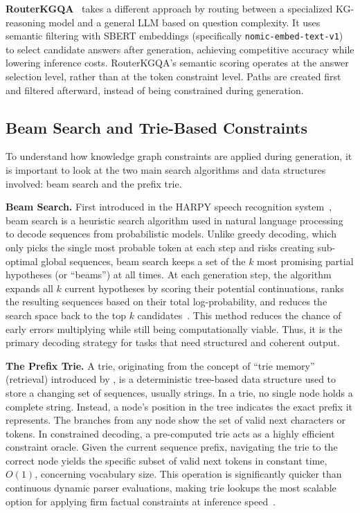 \textbf{RouterKGQA}~\citep{yuan2026routerkgqa} takes a different approach by routing between a specialized KG-reasoning model and a general LLM based on question complexity. It uses semantic filtering with SBERT embeddings (specifically \texttt{nomic-embed-text-v1}) to select candidate answers after generation, achieving competitive accuracy while lowering inference costs. RouterKGQA's semantic scoring operates at the answer selection level, rather than at the token constraint level. Paths are created first and filtered afterward, instead of being constrained during generation.

\subsection{Beam Search and Trie-Based Constraints}

To understand how knowledge graph constraints are applied during generation, it is important to look at the two main search algorithms and data structures involved: beam search and the prefix trie.

\textbf{Beam Search.} First introduced in the HARPY speech recognition system~\citep{lowerre1976harpy}, beam search is a heuristic search algorithm used in natural language processing to decode sequences from probabilistic models. Unlike greedy decoding, which only picks the single most probable token at each step and risks creating sub-optimal global sequences, beam search keeps a set of the $k$ most promising partial hypotheses (or ``beams'') at all times. At each generation step, the algorithm expands all $k$ current hypotheses by scoring their potential continuations, ranks the resulting sequences based on their total log-probability, and reduces the search space back to the top $k$ candidates~\citep{holtzman2020curious}. This method reduces the chance of early errors multiplying while still being computationally viable. Thus, it is the primary decoding strategy for tasks that need structured and coherent output.

\textbf{The Prefix Trie.} A trie, originating from the concept of ``trie memory'' (retrieval) introduced by \citet{fredkin1960trie}, is a deterministic tree-based data structure used to store a changing set of sequences, usually strings. In a trie, no single node holds a complete string. Instead, a node's position in the tree indicates the exact prefix it represents. The branches from any node show the set of valid next characters or tokens. In constrained decoding, a pre-computed trie acts as a highly efficient constraint oracle. Given the current sequence prefix, navigating the trie to the correct node yields the specific subset of valid next tokens in constant time, $O(1)$, concerning vocabulary size. This operation is significantly quicker than continuous dynamic parser evaluations, making trie lookups the most scalable option for applying firm factual constraints at inference speed~\citep{willard2023outlines}.

